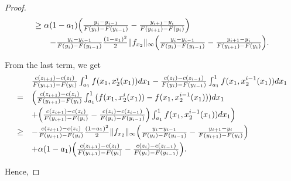 \documentclass[12pt,reqno]{amsart}
\begin{document}
\begin{proof}
\[\begin{array}{ll}
     \ge&\hspace{-0.25cm}\alpha(1-a_1)\Big(\frac{y_{i}-y_{i-1}}{F(y_{i})-F(y_{i-1})}-\frac{y_{i+1}-y_i}{F(y_{i+1})-F(y_{i})}\Big)\vspace{3pt}\\
     &-\frac{y_{i}-y_{i-1}}{F(y_{i})-F(y_{i-1})}\frac{(1-a_1)^2}{2}\|f_{x_2}\|_\infty\Big(\frac{y_i-y_{i-1}}{F(y_i)-F(y_{i-1})}-\frac{y_{i+1}-y_i}{F(y_{i+1})-F(y_i)}\Big).
\end{array}\]

From the last term, we get 
    \[\begin{array}{ll}
    &\frac{c(z_{i+1})-c(z_i)}{F(y_{i+1})-F(y_i)}\int_{a_1}^{1}f(x_1,x_2^{i}(x_1))dx_1-\frac{c(z_{i})-c(z_{i-1})}{F(y_i)-F(y_{i-1})}\int_{a_1}^{1}f(x_1,x_2^{i-1}(x_1))dx_1\vspace{3pt}\\
   = &\Big(\frac{c(z_{i+1})-c(z_i)}{F(y_{i+1})-F(y_i)}\int_{a_1}^{1}(f(x_1,x_2^{i}(x_1))-f(x_1,x_2^{i-1}(x_1)))dx_1\vspace{3pt}\\
   &+\Big(\frac{c(z_{i+1})-c(z_i)}{F(y_{i+1})-F(y_i)}-\frac{c(z_{i})-c(z_{i-1})}{F(y_i)-F(y_{i-1})}\Big)\int_{a_1}^{1}f(x_1,x_2^{i-1}(x_1))dx_1\Big)\vspace{3pt}\\
   \ge&-\frac{c(z_{i+1})-c(z_i)}{F(y_{i+1})-F(y_i)}\frac{(1-a_1)^2}{2}\|f_{x_2}\|_\infty\Big(\frac{y_i-y_{i-1}}{F(y_i)-F(y_{i-1})}-\frac{y_{i+1}-y_i}{F(y_{i+1})-F(y_i)}\Big)\vspace{3pt}\\
   &+\alpha(1-a_1)\Big(\frac{c(z_{i+1})-c(z_i)}{F(y_{i+1})-F(y_i)}-\frac{c(z_{i})-c(z_{i-1})}{F(y_i)-F(y_{i-1})}\Big).
    \end{array}\]

Hence,


\end{proof}
\end{document}
